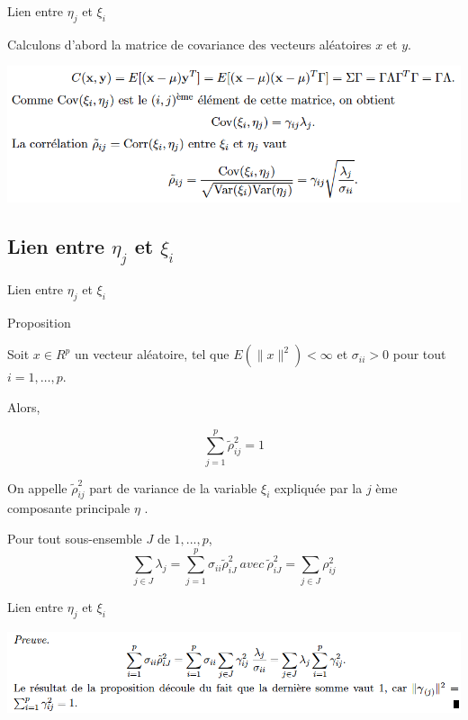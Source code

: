 \documentclass[10pt]{beamer}
\begin{document}

\begin{frame}{Lien entre $\eta_j$ et $\xi_i$}

  
  Calculons d’abord la matrice de covariance des vecteurs aléatoires $x$ et $y$.
  
  \includegraphics[scale=0.4]{EtaVar.png}
  
  
\end{frame}



\subsection{Lien entre $\eta_j$ et $\xi_i$}
\begin{frame}{Lien entre $\eta_j$ et $\xi_i$}

  \begin{block}{Proposition}
  
  Soit $x \in R^p$ un vecteur aléatoire, tel que $E(\parallel x \parallel^2) < \infty$ et $\sigma_{ii} > 0$ pour tout $i = 1, \ldots ,p$. 
 
  Alors, 
  
  $$\sum_{j=1}^p \tilde{\rho}^2_{ij} =1$$
  
  \end{block}
 
  On appelle $ \tilde{\rho}^2_{ij} $ part de variance de la variable $\xi_i$ expliquée par la $j$ ème composante principale $\eta$ .
  
  Pour tout sous-ensemble $J$ de $ {1, . . . ,p}$,
  $$\sum_{j \in J} \lambda_j=\sum_{j=1}^p \sigma_{ii}\tilde{\rho}^2_{iJ} \ avec \  \tilde{\rho}^2_{iJ} = \sum_{j \in J}{\rho}^2_{ij} $$
\end{frame}


\begin{frame}{Lien entre $\eta_j$ et $\xi_i$}


 \includegraphics[scale=0.37]{Rho_ij.png}


\end{frame}
\end{document}
